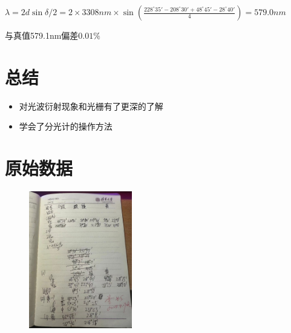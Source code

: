 \documentclass{ctexart}
\begin{document}
  $\lambda=2d \sin{\delta / 2}
    =2 \times 3308nm \times \sin(\frac{228^{\circ}35'-208^{\circ}30'+48^{\circ}45'-28^{\circ}40'}{4})
    =579.0nm$

  与真值579.1nm偏差$0.01 \%$
\section{总结}
\begin{itemize}
  \item 对光波衍射现象和光栅有了更深的了解
  \item 学会了分光计的操作方法
\end{itemize}
\section{原始数据}
\begin{figure}[htbp]
  \centering
  \includegraphics[width=0.4\textwidth,height=0.5\textwidth]{微信图片_20240424235811.jpg}
  \end{figure} 
\end{document}
